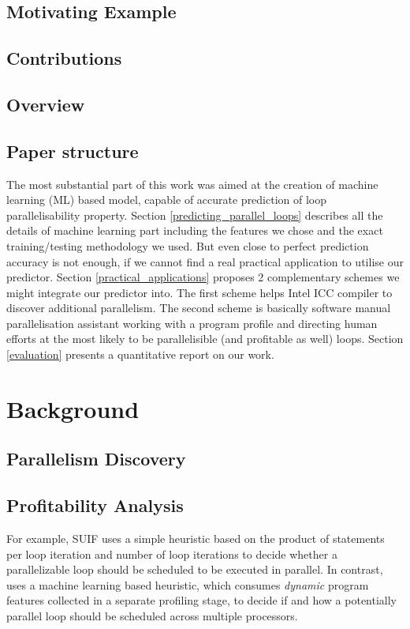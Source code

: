 \documentclass[sigconf,10pt,review,anonymous]{acmart}
\begin{document}
\subsection{Motivating Example}

\subsection{Contributions}

\subsection{Overview}

\subsection{Paper structure}
\quad The most substantial part of this work was aimed at the creation of machine learning (ML) based model, capable of accurate prediction of loop parallelisability property. Section \ref{predicting_parallel_loops} describes all the details of machine learning part including the features we chose and the exact training/testing methodology we used. But even close to perfect prediction accuracy is not enough, if we cannot find a real practical application to utilise our predictor. Section \ref{practical_applications} proposes 2 complementary schemes we might integrate our predictor into. The first scheme helps Intel ICC compiler to discover additional parallelism. The second scheme is basically software manual parallelisation assistant working with a program profile and directing human efforts at the most likely to be parallelisible (and profitable as well) loops. Section \ref{evaluation} presents a quantitative report on our work.  

\section{Background}

\subsection{Parallelism Discovery}

\subsection{Profitability Analysis}

For example, SUIF \cite{Wilson:1994:SIR:193209.193217} uses a simple heuristic based on the product of statements per loop iteration and number of loop iterations to decide whether a parallelizable loop should be scheduled to be executed in parallel. In contrast, \cite{Tournavitis:2009:THA:1542476.1542496} uses a machine learning based heuristic, which consumes \textit{dynamic} program features collected in a separate profiling stage, to decide if and how a potentially parallel loop should be scheduled across multiple processors.
\end{document}
